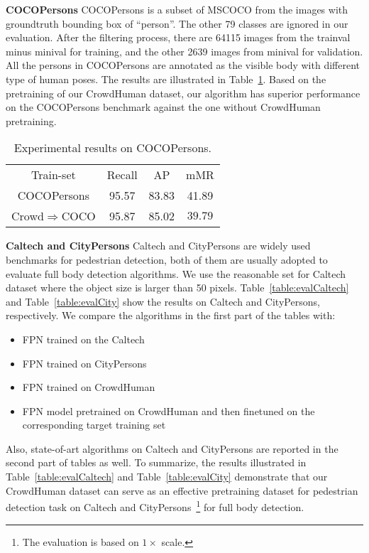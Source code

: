 \documentclass[10pt,twocolumn,letterpaper]{article}
\newcommand{\myparagraph}[1]{{\vspace{0.5em} \noindent \bf #1}}
\begin{document}
\myparagraph{COCOPersons} COCOPersons is a subset of MSCOCO from the images with groundtruth bounding box of ``person''. The other 79 classes are ignored in our evaluation. After the filtering process, there are 64115 images from the trainval minus minival for training, and the other 2639 images from minival for validation. All the persons in COCOPersons are annotated as the visible body with different type of human poses. The results are illustrated in Table~\ref{table:cocoperson}. Based on the pretraining of our CrowdHuman dataset, our algorithm has superior performance on the COCOPersons benchmark against the one without CrowdHuman pretraining. 

\setlength{\tabcolsep}{4pt}
\begin{table}
\begin{center}
\caption{Experimental results on COCOPersons.}
\label{table:cocoperson}
\begin{tabular}{cccc}
\hline\noalign{\smallskip}
{Train-set} & Recall & AP & mMR\\
\noalign{\smallskip}
\hline
\noalign{\smallskip}
COCOPersons & {95.57}  & {83.83} & {41.89}\\
Crowd$\Rightarrow$COCO & {95.87}  & {85.02} & {$\mathbf{39.79}$}\\
\hline
\end{tabular}
\end{center}
\end{table}
\setlength{\tabcolsep}{1.4pt}


\myparagraph{Caltech and CityPersons} Caltech and CityPersons are widely used benchmarks for pedestrian detection, both of them are usually adopted to evaluate full body detection algorithms. We use the reasonable set for Caltech dataset where the object size is larger than 50 pixels.  
Table~\ref{table:evalCaltech} and Table~\ref{table:evalCity} show the results on Caltech and CityPersons, respectively. We compare the algorithms in the first part of the tables with:
\begin{itemize}
    \item FPN trained on the Caltech
    \item FPN trained on CityPersons
    \item FPN trained on CrowdHuman
    \item FPN model pretrained on CrowdHuman and then finetuned on the corresponding target training set
\end{itemize}
Also, state-of-art algorithms on Caltech and CityPersons are reported in the second part of tables as well.
To summarize, the results illustrated in Table~\ref{table:evalCaltech} and Table~\ref{table:evalCity}  demonstrate that our CrowdHuman dataset can serve as an effective pretraining dataset for pedestrian detection task on Caltech and CityPersons~\footnote{The evaluation is based on $1\times$ scale.} for full body detection.
\end{document}
